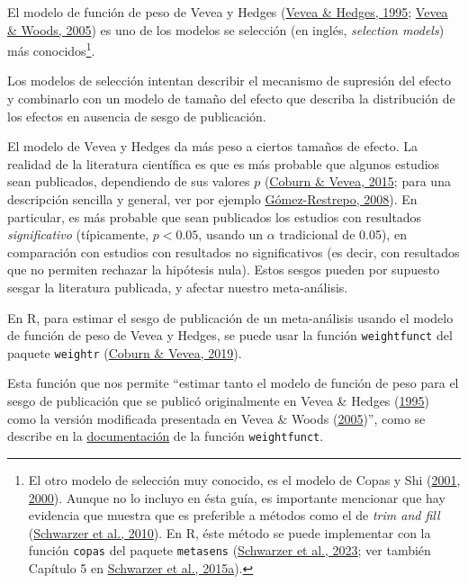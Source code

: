 \documentclass[
  bookmarksnumbered]{article}
\begin{document}
El modelo de función de peso de Vevea y Hedges (\protect\hyperlink{ref-veveaGeneralLinearModel1995}{Vevea \& Hedges, 1995}; \protect\hyperlink{ref-veveaPublicationBiasResearch2005}{Vevea \& Woods, 2005}) es uno de los modelos se selección (en inglés, \emph{selection models}) más conocidos\footnote{El otro modelo de selección muy conocido, es el modelo de Copas y Shi (\protect\hyperlink{ref-copasSensitivityAnalysisPublication2001}{2001}, \protect\hyperlink{ref-copasMetaanalysisFunnelPlots2000}{2000}). Aunque no lo incluyo en ésta guía, es importante mencionar que hay evidencia que muestra que es preferible a métodos como el de \emph{trim and fill} (\protect\hyperlink{ref-schwarzerEmpiricalEvaluationSuggests2010}{Schwarzer et al., 2010}). En R, éste método se puede implementar con la función \texttt{copas} del paquete \texttt{metasens} (\protect\hyperlink{ref-schwarzerMetasensPackage}{Schwarzer et al., 2023}; ver también Capítulo 5 en \protect\hyperlink{ref-schwarzerMetaAnalysis2015}{Schwarzer et al., 2015a}).}.

Los modelos de selección intentan describir el mecanismo de supresión del efecto y combinarlo con un modelo de tamaño del efecto que describa la distribución de los efectos en ausencia de sesgo de publicación.

El modelo de Vevea y Hedges da más peso a ciertos tamaños de efecto. La realidad de la literatura científica es que es más probable que algunos estudios sean publicados, dependiendo de sus valores \(p\) (\protect\hyperlink{ref-coburnPublicationBiasFunction2015}{Coburn \& Vevea, 2015}; para una descripción sencilla y general, ver por ejemplo \protect\hyperlink{ref-SesgoPublicacion2008}{Gómez-Restrepo, 2008}). En particular, es más probable que sean publicados los estudios con resultados \emph{significativo} (típicamente, \(p < 0.05\), usando un \(\alpha\) tradicional de 0.05), en comparación con estudios con resultados no significativos (es decir, con resultados que no permiten rechazar la hipótesis nula). Estos sesgos pueden por supuesto sesgar la literatura publicada, y afectar nuestro meta-análisis.

En R, para estimar el sesgo de publicación de un meta-análisis usando el modelo de función de peso de Vevea y Hedges, se puede usar la función \texttt{weightfunct} del paquete \texttt{weightr} (\protect\hyperlink{ref-coburnWeightr2019}{Coburn \& Vevea, 2019}).

Esta función que nos permite ``estimar tanto el modelo de función de peso para el sesgo de publicación que se publicó originalmente en Vevea \& Hedges (\protect\hyperlink{ref-veveaGeneralLinearModel1995}{1995}) como la versión modificada presentada en Vevea \& Woods (\protect\hyperlink{ref-veveaPublicationBiasResearch2005}{2005})'', como se describe en la \href{https://www.rdocumentation.org/packages/weightr/versions/2.0.2/topics/weightfunct}{documentación} de la función \texttt{weightfunct}.
\end{document}
